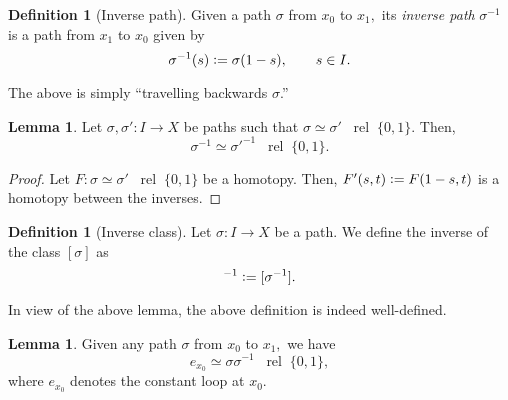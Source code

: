 \documentclass[12pt]{article}
\theoremstyle{definition}
\numberwithin{thm}{section}
\newtheorem{lem}[thm]{Lemma}
\newtheorem{defn}[thm]{Definition}
\newcommand{\rel}{\;\;\operatorname{rel}\;}
\begin{document}
\begin{defn}[Inverse path]
	Given a path $\sigma$ from $x_0$ to $x_1,$ its \emph{inverse path} $\sigma^{-1}$ is a path from $x_1$ to $x_0$ given by
	\begin{equation*} 
		\sigma^{-1}(s) \vcentcolon= \sigma(1 - s), \qquad s \in I.
	\end{equation*}
\end{defn}
The above is simply ``travelling backwards $\sigma$.''
\begin{lem} 
	Let $\sigma, \sigma':I \to X$ be paths such that $\sigma \simeq \sigma' \rel \{0, 1\}.$ Then,
	\begin{equation*} 
		\sigma^{-1} \simeq \sigma'^{-1} \rel \{0, 1\}.
	\end{equation*}
\end{lem}
\begin{proof} 
	Let $F:\sigma \simeq \sigma' \rel \{0, 1\}$ be a homotopy. Then, $F'(s, t) \vcentcolon= F(1 - s, t)$ is a homotopy between the inverses.
\end{proof}

\begin{defn}[Inverse class]
	Let $\sigma:I \to X$ be a path. We define the inverse of the class $[\sigma]$ as
	\begin{equation*} 
		[\sigma]^{-1} \vcentcolon= [\sigma^{-1}].
	\end{equation*}
\end{defn}
In view of the above lemma, the above definition is indeed well-defined.

\begin{lem} \label{lem:prodinv}
	Given any path $\sigma$ from $x_0$ to $x_1,$ we have
	\begin{equation*} 
		e_{x_0} \simeq \sigma\sigma^{-1} \rel \{0, 1\},
	\end{equation*}
	where $e_{x_0}$ denotes the constant loop at $x_0.$
\end{lem}
\end{document}
